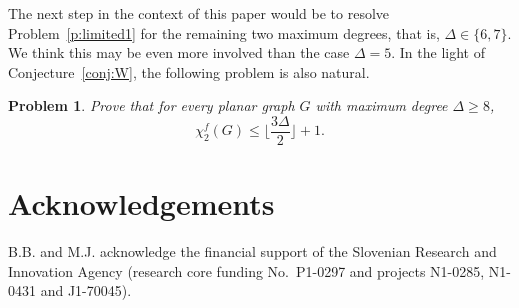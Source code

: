\documentclass[10pt,a4paper]{article}
\newcommand{\fk}{\chi_{k}^{f}}
\newcommand{\fd}{\chi_{2}^{f}}
\newtheorem{problem}[theorem]{Problem}
\begin{document}
The next step in the context of this paper would be to resolve Problem~\ref{p:limited1} for the remaining two maximum degrees, that is, $\Delta\in \{6,7\}$. We think this may be even more involved than the case $\Delta=5$. In the light of Conjecture~\ref{conj:W}, the following problem is also natural. 

\begin{problem}
Prove that for every planar graph $G$ with maximum degree $\Delta\ge 8$, $$\fd(G)\le \Big\lfloor\frac{3\Delta}{2}\Big\rfloor+1.$$ 
\end{problem}



 


\section*{Acknowledgements}
B.B. and M.J. acknowledge the financial support of the Slovenian Research and Innovation Agency (research core funding No.\ P1-0297 and projects N1-0285, N1-0431 and J1-70045).
\end{document}
